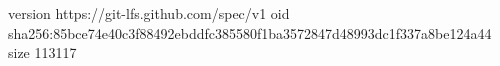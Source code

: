 version https://git-lfs.github.com/spec/v1
oid sha256:85bce74e40c3f88492ebddfc385580f1ba3572847d48993dc1f337a8be124a44
size 113117
